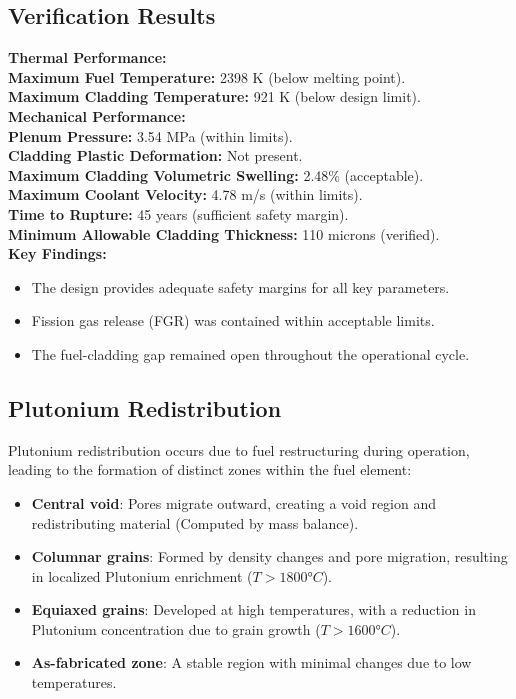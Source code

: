 \documentclass[11pt,a4paper,twoside]{article}
\begin{document}
\subsection{Verification Results}
\textbf{Thermal Performance:} \\
{\color{green}\checkmark} \textbf{Maximum Fuel Temperature:} 2398 K (below melting point). \\
{\color{green}\checkmark} \textbf{Maximum Cladding Temperature:} 921 K (below design limit). \\

\textbf{Mechanical Performance:} \\
{\color{green}\checkmark} \textbf{Plenum Pressure:} 3.54 MPa (within limits).\\
{\color{green}\checkmark} \textbf{Cladding Plastic Deformation:} Not present. \\
{\color{green}\checkmark} \textbf{Maximum Cladding Volumetric Swelling:} 2.48\% (acceptable).\\
{\color{green}\checkmark} \textbf{Maximum Coolant Velocity:} 4.78 m/s (within limits).\\
{\color{green}\checkmark} \textbf{Time to Rupture:} 45 years (sufficient safety margin).\\
{\color{green}\checkmark} \textbf{Minimum Allowable Cladding Thickness:} 110 microns (verified).\\


\textbf{Key Findings:}
\begin{itemize}
    \item The design provides adequate safety margins for all key parameters.
    \item Fission gas release (FGR) was contained within acceptable limits.
    \item The fuel-cladding gap remained open throughout the operational cycle.
\end{itemize}

\subsection{Plutonium Redistribution}

Plutonium redistribution occurs due to fuel restructuring during operation, leading to the formation of distinct zones within the fuel element:

\begin{itemize}
    \item \textbf{Central void}: Pores migrate outward, creating a void region and redistributing material (Computed by mass balance).
    \item \textbf{Columnar grains}: Formed by density changes and pore migration, resulting in localized Plutonium enrichment ($T > 1800° C$).
    \item \textbf{Equiaxed grains}: Developed at high temperatures, with a reduction in Plutonium concentration due to grain growth ($T > 1600° C$).
    \item \textbf{As-fabricated zone}: A stable region with minimal changes due to low temperatures.
\end{itemize}
\end{document}

